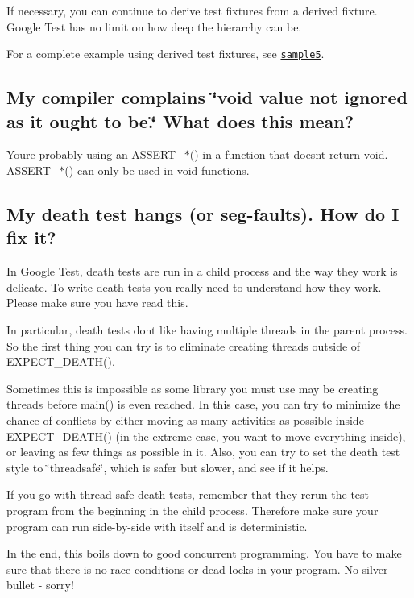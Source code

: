 If necessary, you can continue to derive test fixtures from a derived fixture. Google Test has no limit on how deep the hierarchy can be.

For a complete example using derived test fixtures, see \href{../samples/sample5_unittest.cc}{\tt sample5}.

\subsection*{My compiler complains \char`\"{}void value not ignored as it ought to be.\char`\"{} What does this mean?}

You\textquotesingle{}re probably using an {\ttfamily A\+S\+S\+E\+R\+T\+\_\+$\ast$()} in a function that doesn\textquotesingle{}t return {\ttfamily void}. {\ttfamily A\+S\+S\+E\+R\+T\+\_\+$\ast$()} can only be used in {\ttfamily void} functions.

\subsection*{My death test hangs (or seg-\/faults). How do I fix it?}

In Google Test, death tests are run in a child process and the way they work is delicate. To write death tests you really need to understand how they work. Please make sure you have read this.

In particular, death tests don\textquotesingle{}t like having multiple threads in the parent process. So the first thing you can try is to eliminate creating threads outside of {\ttfamily E\+X\+P\+E\+C\+T\+\_\+\+D\+E\+A\+T\+H()}.

Sometimes this is impossible as some library you must use may be creating threads before {\ttfamily main()} is even reached. In this case, you can try to minimize the chance of conflicts by either moving as many activities as possible inside {\ttfamily E\+X\+P\+E\+C\+T\+\_\+\+D\+E\+A\+T\+H()} (in the extreme case, you want to move everything inside), or leaving as few things as possible in it. Also, you can try to set the death test style to {\ttfamily \char`\"{}threadsafe\char`\"{}}, which is safer but slower, and see if it helps.

If you go with thread-\/safe death tests, remember that they rerun the test program from the beginning in the child process. Therefore make sure your program can run side-\/by-\/side with itself and is deterministic.

In the end, this boils down to good concurrent programming. You have to make sure that there is no race conditions or dead locks in your program. No silver bullet -\/ sorry!

